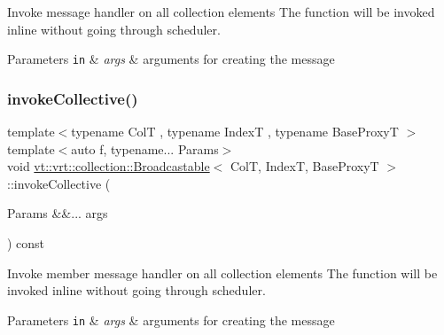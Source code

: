Invoke message handler on all collection elements The function will be invoked inline without going through scheduler. 


\begin{DoxyParams}[1]{Parameters}
\mbox{\tt in}  & {\em args} & arguments for creating the message \\
\hline
\end{DoxyParams}
\mbox{\label{structvt_1_1vrt_1_1collection_1_1_broadcastable_a33918a1a36fb837635fa74c9610efeb8}} 
\subsubsection{\texorpdfstring{invoke\+Collective()}{invokeCollective()}\hspace{0.1cm}{\footnotesize\ttfamily [3/3]}}
{\footnotesize\ttfamily template$<$typename ColT , typename IndexT , typename Base\+ProxyT $>$ \\
template$<$auto f, typename... Params$>$ \\
void \hyperlink{structvt_1_1vrt_1_1collection_1_1_broadcastable}{vt\+::vrt\+::collection\+::\+Broadcastable}$<$ ColT, IndexT, Base\+ProxyT $>$\+::invoke\+Collective (\begin{DoxyParamCaption}\item[{Params \&\&...}]{args }\end{DoxyParamCaption}) const}



Invoke member message handler on all collection elements The function will be invoked inline without going through scheduler. 


\begin{DoxyParams}[1]{Parameters}
\mbox{\tt in}  & {\em args} & arguments for creating the message \\
\hline
\end{DoxyParams}
\mbox{\label{structvt_1_1vrt_1_1collection_1_1_broadcastable_a40df56c587e61448857f71acedce53bc}} 
